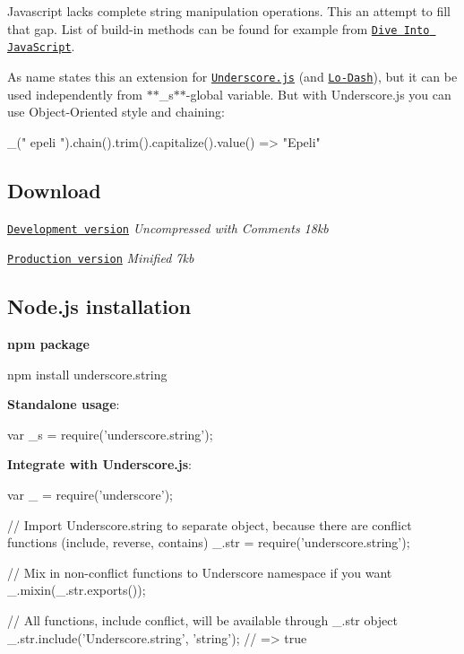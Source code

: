 Javascript lacks complete string manipulation operations. This an attempt to fill that gap. List of build-\/in methods can be found for example from \href{http://www.diveintojavascript.com/core-javascript-reference/the-string-object}{\tt Dive Into Java\+Script}.

As name states this an extension for \href{http://underscorejs.org/}{\tt Underscore.\+js} (and \href{http://lodash.com/}{\tt Lo-\/\+Dash}), but it can be used independently from $\ast$$\ast$\+\_\+s$\ast$$\ast$-\/global variable. But with Underscore.\+js you can use Object-\/\+Oriented style and chaining\+:


\begin{DoxyCode}
\_("   epeli  ").chain().trim().capitalize().value()
=> "Epeli"
\end{DoxyCode}


\subsection*{Download}


\begin{DoxyItemize}
\item \href{https://raw.github.com/epeli/underscore.string/master/lib/underscore.string.js}{\tt Development version} {\itshape Uncompressed with Comments 18kb}
\item \href{https://github.com/epeli/underscore.string/raw/master/dist/underscore.string.min.js}{\tt Production version} {\itshape Minified 7kb}
\end{DoxyItemize}

\subsection*{Node.\+js installation}

{\bfseries npm package} \begin{DoxyVerb}npm install underscore.string
\end{DoxyVerb}


{\bfseries Standalone usage}\+:


\begin{DoxyCode}
var \_s = require('underscore.string');
\end{DoxyCode}


{\bfseries Integrate with Underscore.\+js}\+:


\begin{DoxyCode}
var \_  = require('underscore');

// Import Underscore.string to separate object, because there are conflict functions (include, reverse,
       contains)
\_.str = require('underscore.string');

// Mix in non-conflict functions to Underscore namespace if you want
\_.mixin(\_.str.exports());

// All functions, include conflict, will be available through \_.str object
\_.str.include('Underscore.string', 'string'); // => true
\end{DoxyCode}


